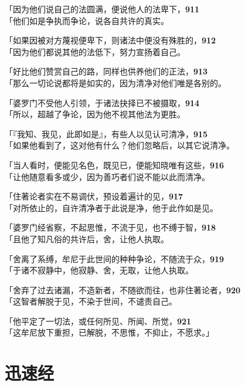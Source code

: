 「因为他们说自己的法圆满，便说他人的法卑下，\hfill{\grayfootnotesize \textbf{911}} \\
「他们如是争执而争论，说各自共许的真实。


「如果因被对方蔑视便卑下，则诸法中便没有殊胜的，\hfill{\grayfootnotesize \textbf{912}} \\
「因为他们都说其他的法低下，努力宣扬着自己。


「好比他们赞赏自己的路，同样也供养他们的正法，\hfill{\grayfootnotesize \textbf{913}} \\
「那么一切论说都将是如实的，因为清净对他们唯是各别的。


「婆罗门不受他人引领，于诸法抉择已不被摄取，\hfill{\grayfootnotesize \textbf{914}} \\
「所以，超越了争论，因为他不视其他法为更胜。


「『我知、我见，此即如是』，有些人以见认可清净，\hfill{\grayfootnotesize \textbf{915}} \\
「如果他看到了，这对他有什么？他们忽略后，以其它说清净。


「当人看时，便能见名色，既见已，便能知晓唯有这些，\hfill{\grayfootnotesize \textbf{916}} \\
「让他随意看多或少，因为善巧者们说不能以此而清净。


「住著论者实在不易调伏，预设着遍计的见，\hfill{\grayfootnotesize \textbf{917}} \\
「对所依止的，自许清净者于此说是净，他于此作如是见。


「婆罗门经省察，不起思惟，不流于见，也不缚于智，\hfill{\grayfootnotesize \textbf{918}} \\
「且他了知凡俗的共许后，舍，让他人执取。


「舍离了系缚，牟尼于此世间的种种争论，不随流于众，\hfill{\grayfootnotesize \textbf{919}} \\
「于诸不寂静中，他寂静、舍，无取，让他人执取。


「舍弃了过去诸漏，不造新者，不随欲而往，也非住著论者，\hfill{\grayfootnotesize \textbf{920}} \\
「这智者解脱于见，不染于世间，不谴责自己。


「他平定了一切法，或任何所见、所闻、所觉，\hfill{\grayfootnotesize \textbf{921}} \\
「这牟尼放下重担，已解脱，不思惟，不抑止，不愿求。」


\section{迅速经}


